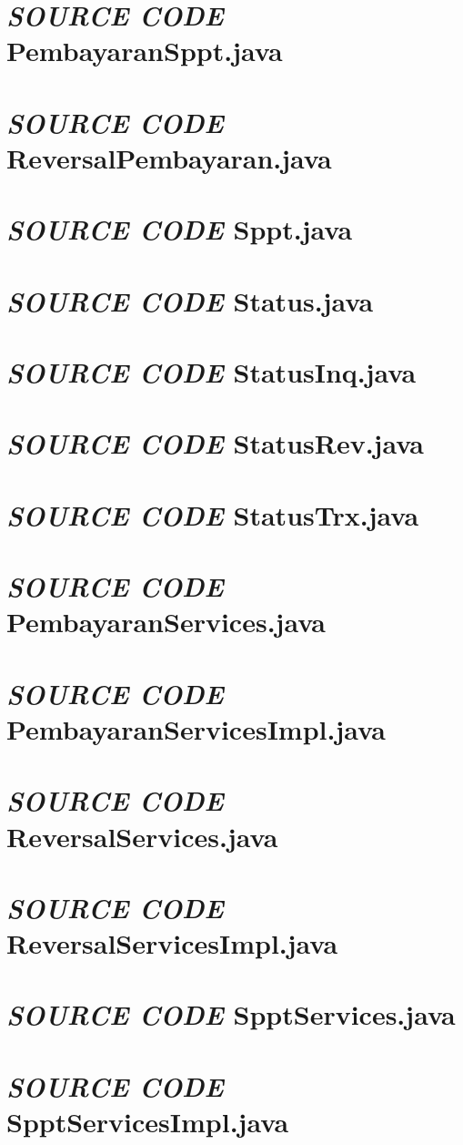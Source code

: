 \documentclass[pdftex,12pt, oneside]{article}
\begin{document}
\section{\textit{SOURCE CODE} PembayaranSppt.java}


\section{\textit{SOURCE CODE} ReversalPembayaran.java}


\section{\textit{SOURCE CODE} Sppt.java}


\section{\textit{SOURCE CODE} Status.java}


\section{\textit{SOURCE CODE} StatusInq.java}


\section{\textit{SOURCE CODE} StatusRev.java}


\section{\textit{SOURCE CODE} StatusTrx.java}


\section{\textit{SOURCE CODE} PembayaranServices.java}


\section{\textit{SOURCE CODE} PembayaranServicesImpl.java}


\section{\textit{SOURCE CODE} ReversalServices.java}


\section{\textit{SOURCE CODE} ReversalServicesImpl.java}


\section{\textit{SOURCE CODE} SpptServices.java}


\section{\textit{SOURCE CODE} SpptServicesImpl.java}
\end{document}
